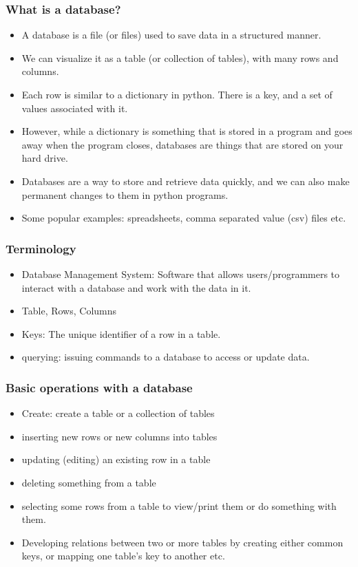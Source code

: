 \documentclass{beamer}
\begin{document}
\begin{frame}
\frametitle{What is a database?}
\begin{itemize}
\item A database is a file (or files) used to save data in a structured manner. 
\item We can visualize it as a table (or collection of tables), with many rows and columns.
\item Each row is similar to a dictionary in python. There is a key, and a set of values associated with it. 
\item However, while a dictionary is something that is stored in a program and goes away when the program closes, databases are things that are stored on your hard drive.
\item Databases are a way to store and retrieve data quickly, and we can also make permanent changes to them in python programs.
\item Some popular examples: spreadsheets, comma separated value (csv) files etc.
\end{itemize}
\end{frame}

\begin{frame}
\frametitle{Terminology}
\begin{itemize}
\item Database Management System: Software that allows users/programmers to interact with a database and work with the data in it.
\item Table, Rows, Columns
\item Keys: The unique identifier of a row in a table.
\item querying: issuing commands to a database to access or update data.
\end{itemize}
\end{frame}

\begin{frame}
\frametitle{Basic operations with a database}
\begin{itemize}
\item Create: create a table or a collection of tables
\item inserting new rows or new columns into tables
\item updating (editing) an existing row in a table
\item deleting something from a table
\item selecting some rows from a table to view/print them or do something with them.
\item Developing relations between two or more tables by creating either common keys, or mapping one table's key to another etc.
\end{itemize}
\end{frame}
\end{document}
